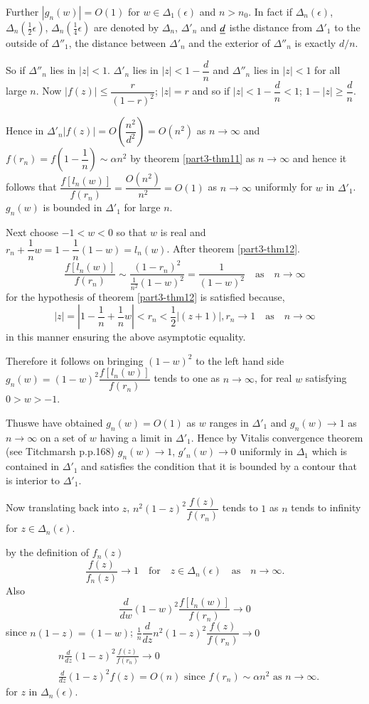 Further $|g_{n}(w)|=O(1)$ for $w\in\Delta_{1}(\epsilon)$ and
$n>n_{0}$. In fact if $\Delta_{n}(\epsilon)$,
$\Delta_{n}(\frac{1}{2}\epsilon)$, $\Delta_{n}(\frac{1}{4}\epsilon)$
are denoted by $\Delta_{n}$, $\Delta'_{n}$ and $\underline{d}$ 
is\pageoriginale the distance from $\Delta'_{1}$ to the outside of
$\Delta''_{1}$, the distance between $\Delta'_{n}$ and the exterior of
$\Delta''_{n}$ is exactly $d/n$.

So if $\Delta''_{n}$ lies in $|z|<1$. $\Delta'_{n}$ lies in
$|z|<1-\dfrac{d}{n}$ and $\Delta''_{n}$ lies in $|z|<1$ for all large
$n$. Now $|f(z)|\leq \dfrac{r}{(1-r)^{2}}$; $|z|=r$ and so if
$|z|<1-\dfrac{d}{n}<1$; $1-|z|\geq \dfrac{d}{n}$.

Hence in
$\Delta'_{n}|f(z)|=O\left(\dfrac{n^{2}}{d^{2}}\right)=O(n^{2})$ as
$n\to \infty$ and $f(r_{n})=f\left(1-\dfrac{1}{n}\right)\sim \alpha
n^{2}$ by theorem \ref{part3-thm11} as $n\to \infty$ and hence it
follows that
$\dfrac{f[l_{n}(w)]}{f(r_{n})}=\dfrac{O(n^{2})}{n^{2}}=O(1)$ as
$n\to \infty$ uniformly for $w$ in $\Delta'_{1}$. \iec $g_{n}(w)$ is
bounded in $\Delta'_{1}$ for large $n$.

Next choose $-1<w<0$ so that $w$ is real and
$r_{n}+\dfrac{1}{n}w=1-\dfrac{1}{n}(1-w)=l_{n}(w)$. After theorem
\ref{part3-thm12}.
$$
\frac{f[l_{n}(w)]}{f(r_{n})}\sim
\frac{(1-r_{n})^{2}}{\frac{1}{n^{2}}(1-w)^{2}}=\frac{1}{(1-w)^{2}}\quad\text{as}\quad
n\to \infty
$$
for the hypothesis of theorem \ref{part3-thm12} is satisfied because, 
$$
|z|=\left|1-\frac{1}{n}+\frac{1}{n}w\right|<r_{n}<\frac{1}{2}|(z+1)|,
r_{n}\to 1\quad\text{as}\quad n\to \infty
$$
in this manner ensuring the above asymptotic equality.

Therefore it follows on bringing $(1-w)^{2}$ to the left hand side
$g_{n}(w)=(1-w)^{2}\dfrac{f[l_{n}(w)]}{f(r_{n})}$ tends to one as
$n\to \infty$, for real $w$ satisfying $0>w>-1$.

Thus\pageoriginale we have obtained $g_{n}(w)=O(1)$ as $w$ ranges in
$\Delta'_{1}$ and $g_{n}(w)\to 1$ as $n\to \infty$ on a set of $w$
having a limit in $\Delta'_{1}$. Hence by Vitalis convergence theorem
(see Titchmarsh p.p.\@ 168) $g_{n}(w)\to 1$, $g'_{n}(w)\to 0$
uniformly in $\Delta_{1}$ which is contained in $\Delta'_{1}$ and
satisfies the condition that it is bounded by a contour that is
interior to $\Delta'_{1}$.

Now translating back into $z$, $n^{2}(1-z)^{2}\dfrac{f(z)}{f(r_{n})}$
tends to $1$ as $n$ tends to infinity for $z\in \Delta_{n}(\epsilon)$.

\ie by the definition of $f_{n}(z)$
$$
\frac{f(z)}{f_{n}(z)}\to 1\quad\text{for}\quad z\in
\Delta_{n}(\epsilon)\quad\text{as}\quad n\to \infty.
$$
Also
$$
\frac{d}{dw}(1-w)^{2}\frac{f[l_{n}(w)]}{f(r_{n})}\to 0
$$
since $n(1-z)=(1-w)$;
$\frac{1}{n}\dfrac{d}{dz}n^{2}(1-z)^{2}\dfrac{f(z)}{f(r_{n})}\to 0$
\begin{align*}
& n\frac{d}{dz}(1-z)^{2}\frac{f(z)}{f(r_{n})}\to 0\\
& \frac{d}{dz}(1-z)^{2}f(z)= O(n)\text{ \  since \ }
  f(r_{n})\sim\alpha n^{2}\text{ \ as \ } n\to \infty.
\end{align*}
for $z$ in $\Delta_{n}(\epsilon)$.

